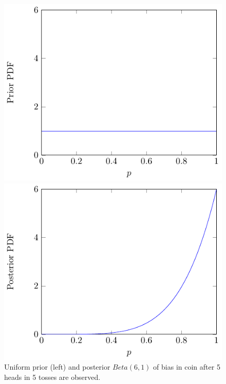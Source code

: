 \begin{figure}[h!]
\centering
\begin{minipage}{.5\textwidth}
  \centering
  \includegraphics[width=0.9\linewidth]{tikz/figure1.pdf}
\end{minipage}%
\begin{minipage}{.5\textwidth}
  \centering
  \includegraphics[width=0.9\linewidth]{tikz/figure2.pdf}
\end{minipage}
\caption{%
Uniform prior (left) and posterior \(Beta(6,1)\) of bias in 
coin after 5 heads in 5 tosses are observed.}
\label{fig:prior}
\end{figure}

